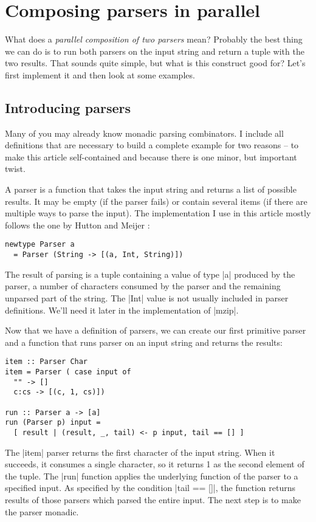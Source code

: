 \documentclass{tmr}
\begin{document}

\section{Composing parsers in parallel}
What does a \textit{parallel composition of two parsers} mean? Probably the best thing we can do 
is to run both parsers on the input string and return a tuple with the two results. That sounds
quite simple, but what is this construct good for? Let's first implement it and then look at 
some examples. 


\subsection{Introducing parsers}
Many of you may already know monadic parsing combinators. I include all definitions that are 
necessary to build a complete example for two reasons -- to make this article self-contained
and because there is one minor, but important twist.

A parser is a function that takes the 
input string and returns a list of possible results. It may be empty (if the parser fails) or 
contain several items (if there are multiple ways to parse the input). The implementation I use 
in this article mostly follows the one by Hutton and Meijer \cite{monadparsing}:

\begin{verbatim}
newtype Parser a
  = Parser (String -> [(a, Int, String)])
\end{verbatim}
The result of parsing is a tuple containing a value of type |a| produced by the parser, a number
of characters consumed by the parser and the remaining unparsed part of the string. The |Int| value
is not usually included in parser definitions. We'll need it later in the implementation of |mzip|.

Now that we have a definition of parsers, we can create our first primitive parser and a 
function that runs parser on an input string and returns the results:

\begin{verbatim}
item :: Parser Char
item = Parser ( case input of
  "" -> []
  c:cs -> [(c, 1, cs)])
  
run :: Parser a -> [a]
run (Parser p) input = 
  [ result | (result, _, tail) <- p input, tail == [] ]
\end{verbatim}
The |item| parser returns the first character of the input string. When it succeeds, it consumes 
a single character, so it returns 1 as the second element of the tuple. The |run| function
applies the underlying function of the parser to a specified input. As specified by the condition
|tail == []|, the function returns results of those parsers which parsed the entire input.
The next step is to make the parser monadic.
\end{document}
